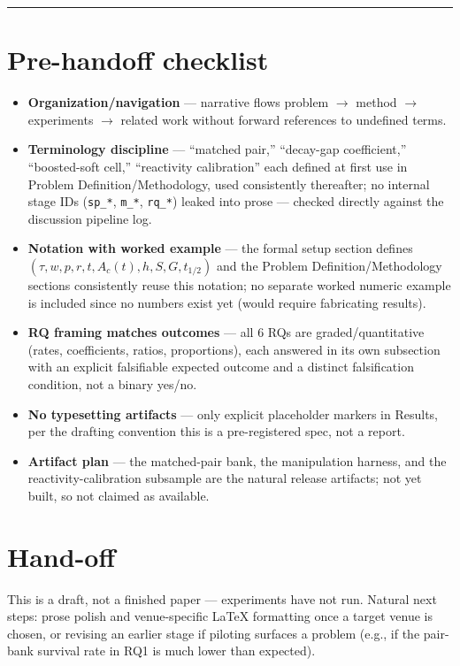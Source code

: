 \documentclass[11pt]{article}
\begin{document}
\vspace{1em}
\hrule
\vspace{1em}

\section*{Pre-handoff checklist}
\begin{itemize}[leftmargin=1.4em]
\item \textbf{Organization/navigation} --- narrative flows problem $\to$ method $\to$ experiments $\to$ related work without forward references to undefined terms.
\item \textbf{Terminology discipline} --- ``matched pair,'' ``decay-gap coefficient,'' ``boosted-soft cell,'' ``reactivity calibration'' each defined at first use in Problem Definition/Methodology, used consistently thereafter; no internal stage IDs (\texttt{sp\_*}, \texttt{m\_*}, \texttt{rq\_*}) leaked into prose --- checked directly against the discussion pipeline log.
\item \textbf{Notation with worked example} --- the formal setup section defines $(\tau, w, p, r, t, A_c(t), h, S, G, t_{1/2})$ and the Problem Definition/Methodology sections consistently reuse this notation; no separate worked numeric example is included since no numbers exist yet (would require fabricating results).
\item \textbf{RQ framing matches outcomes} --- all 6 RQs are graded/quantitative (rates, coefficients, ratios, proportions), each answered in its own subsection with an explicit falsifiable expected outcome and a distinct falsification condition, not a binary yes/no.
\item \textbf{No typesetting artifacts} --- only explicit placeholder markers in Results, per the drafting convention this is a pre-registered spec, not a report.
\item \textbf{Artifact plan} --- the matched-pair bank, the manipulation harness, and the reactivity-calibration subsample are the natural release artifacts; not yet built, so not claimed as available.
\end{itemize}

\section*{Hand-off}
This is a draft, not a finished paper --- experiments have not run. Natural next steps: prose polish and venue-specific LaTeX formatting once a target venue is chosen, or revising an earlier stage if piloting surfaces a problem (e.g., if the pair-bank survival rate in RQ1 is much lower than expected).
\end{document}
